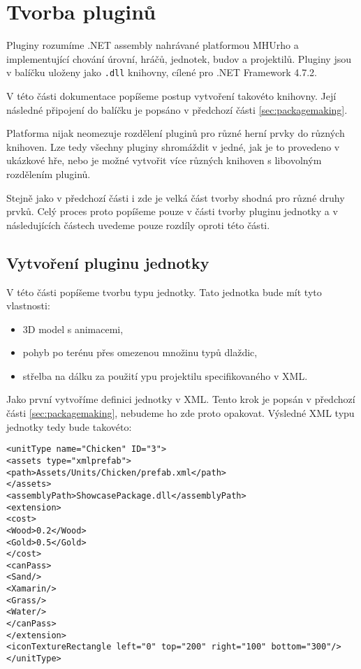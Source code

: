 \chapter{Tvorba pluginů}
Pluginy rozumíme .NET assembly nahrávané platformou MHUrho a implementující chování úrovní, hráčů, jednotek, budov a projektilů. Pluginy jsou v balíčku uloženy jako \texttt{.dll} knihovny, cílené pro .NET Framework 4.7.2. 

V této části dokumentace popíšeme postup vytvoření takovéto knihovny. Její následné připojení do balíčku je popsáno v předchozí části \ref{sec:packagemaking}.

Platforma nijak neomezuje rozdělení pluginů pro různé herní prvky do různých knihoven. Lze tedy všechny pluginy shromáždit v jedné, jak je to provedeno v ukázkové hře, nebo je možné vytvořit více různých knihoven s libovolným rozdělením pluginů.

Stejně jako v předchozí části i zde je velká část tvorby shodná pro různé druhy prvků. Celý proces proto popíšeme pouze v části tvorby pluginu jednotky a v následujících částech uvedeme pouze rozdíly oproti této části.


\section{Vytvoření pluginu jednotky}
\label{sec:unittypeplugin}
V této části popíšeme tvorbu typu jednotky. Tato jednotka bude mít tyto vlastnosti:

\begin{itemize}
	\item 3D model s animacemi,
	\item pohyb po terénu přes omezenou množinu typů dlaždic,
	\item střelba na dálku za použití ypu projektilu specifikovaného v XML.
\end{itemize}

Jako první vytvoříme definici jednotky v XML. Tento krok je popsán v předchozí části \ref{sec:packagemaking}, nebudeme ho zde proto opakovat. Výsledné XML typu jednotky tedy bude takovéto:
\begin{lstlisting}
<unitType name="Chicken" ID="3">
<assets type="xmlprefab">
<path>Assets/Units/Chicken/prefab.xml</path>
</assets>
<assemblyPath>ShowcasePackage.dll</assemblyPath>
<extension>
<cost>
<Wood>0.2</Wood>
<Gold>0.5</Gold>
</cost>
<canPass>
<Sand/>
<Xamarin/>
<Grass/>
<Water/>
</canPass>
</extension>
<iconTextureRectangle left="0" top="200" right="100" bottom="300"/>
</unitType>
\end{lstlisting}

